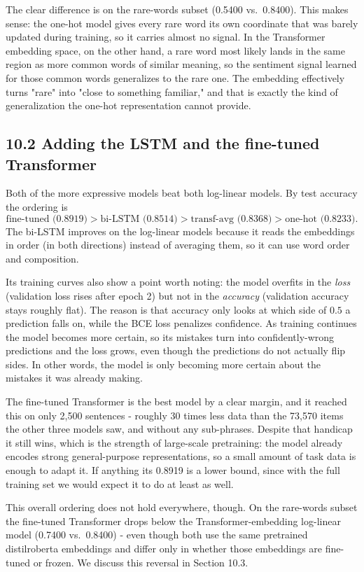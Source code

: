 \documentclass[11pt]{article}
\begin{document}
The clear difference is on the rare-words subset (0.5400 vs.\ 0.8400). This
makes sense: the one-hot model gives every rare word its own coordinate that
was barely updated during training, so it carries almost no signal. In the
Transformer embedding space, on the other hand, a rare word most likely lands
in the same region as more common words of similar meaning, so the sentiment
signal learned for those common words generalizes to the rare one. The
embedding effectively turns "rare" into "close to something familiar," and that
is exactly the kind of generalization the one-hot representation cannot
provide.

\subsection*{10.2 \quad Adding the LSTM and the fine-tuned Transformer}

Both of the more expressive models beat both log-linear models. By test
accuracy the ordering is
\[
\text{fine-tuned (0.8919)} > \text{bi-LSTM (0.8514)} > \text{transf-avg (0.8368)} > \text{one-hot (0.8233)}.
\]
The bi-LSTM improves on the log-linear models because it reads the embeddings in
order (in both directions) instead of averaging them, so it can use word order
and composition.

Its training curves also show a point worth noting: the model overfits in the
\emph{loss} (validation loss rises after epoch 2) but not in the
\emph{accuracy} (validation accuracy stays roughly flat). The reason is that
accuracy only looks at which side of $0.5$ a prediction falls on, while the BCE
loss penalizes confidence. As training continues the model becomes more
certain, so its mistakes turn into confidently-wrong predictions and the loss
grows, even though the predictions do not actually flip sides. In other words,
the model is only becoming more certain about the mistakes it was already
making.

The fine-tuned Transformer is the best model by a clear margin, and it reached
this on only 2{,}500 sentences - roughly 30 times less data than the 73{,}570
items the other three models saw, and without any sub-phrases. Despite that
handicap it still wins, which is the strength of large-scale pretraining: the
model already encodes strong general-purpose representations, so a small amount
of task data is enough to adapt it. If anything its 0.8919 is a lower bound,
since with the full training set we would expect it to do at least as well.

This overall ordering does not hold everywhere, though. On the rare-words
subset the fine-tuned Transformer drops below the Transformer-embedding
log-linear model (0.7400 vs.\ 0.8400) - even though both use the same pretrained
distilroberta embeddings and differ only in whether those embeddings are
fine-tuned or frozen. We discuss this reversal in Section 10.3.
\end{document}
